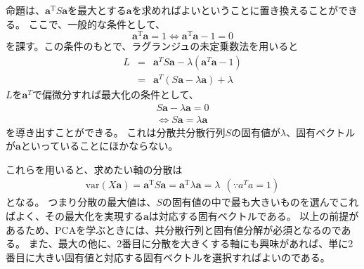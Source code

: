 命題は、$\bm{a}^\mathrm{T} S \bm{a}$を最大とする$\bm{a}$を求めればよいということに置き換えることができる。
ここで、一般的な条件として、
\begin{equation}
  \bm{a}^\mathrm{T}\bm{a}=1 \Leftrightarrow \bm{a}^\mathrm{T}\bm{a}-1=0
\end{equation}
を課す。この条件のもとで、ラグランジュの未定乗数法を用いると
\begin{eqnarray}
  L &=& \bm{a}^T S\bm{a} -\lambda(\bm{a}^T \bm{a}-1) \\
    &=& \bm{a}^T \left( S\bm{a} -\lambda\bm{a} \right) + \lambda 
\end{eqnarray}
$L$を$\bm{a}^T$で偏微分すれば最大化の条件として、
\begin{eqnarray}
    S\bm{a} -\lambda\bm{a} = 0 \\
    \Leftrightarrow S\bm{a}  = \lambda\bm{a} 
\end{eqnarray}
を導き出すことができる。
これは分散共分散行列$S$の固有値が$\lambda$、固有ベクトルが$\bm{a}$といっていることにほかならない。

これらを用いると、求めたい軸の分散は
\begin{eqnarray}
  \mathrm{var}(X\bm{a}) = \bm{a}^\mathrm{T} S \bm{a} =  \bm{a}^\mathrm{T} \lambda \bm{a}  = \lambda~~(\because a^Ta=1)
\end{eqnarray}
となる。
つまり分散の最大値は、$S$の固有値の中で最も大きいものを選んでこればよく、その最大化を実現する$\bm{a}$は対応する固有ベクトルである。
以上の前提があるため、PCAを学ぶときには、共分散行列と固有値分解が必須となるのである。
また、最大の他に、2番目に分散を大きくする軸にも興味があれば、単に2番目に大きい固有値と対応する固有ベクトルを選択すればよいのである。
